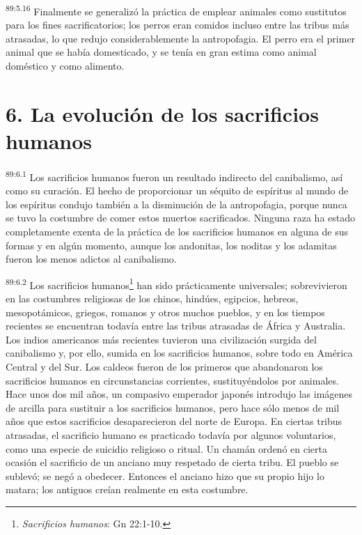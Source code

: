 \par
\textsuperscript{89:5.16} Finalmente se generalizó la práctica de emplear animales como sustitutos para los fines sacrificatorios; los perros eran comidos incluso entre las tribus más atrasadas, lo que redujo considerablemente la antropofagia. El perro era el primer animal que se había domesticado, y se tenía en gran estima como animal doméstico y como alimento.

\section*{6. La evolución de los sacrificios humanos}
\par
\textsuperscript{89:6.1} Los sacrificios humanos fueron un resultado indirecto del canibalismo, así como su curación. El hecho de proporcionar un séquito de espíritus al mundo de los espíritus condujo también a la disminución de la antropofagia, porque nunca se tuvo la costumbre de comer estos muertos sacrificados. Ninguna raza ha estado completamente exenta de la práctica de los sacrificios humanos en alguna de sus formas y en algún momento, aunque los andonitas, los noditas y los adamitas fueron los menos adictos al canibalismo.

\par
\textsuperscript{89:6.2} Los sacrificios humanos\footnote{\textit{Sacrificios humanos}: Gn 22:1-10.} han sido prácticamente universales; sobrevivieron en las costumbres religiosas de los chinos, hindúes, egipcios, hebreos, mesopotámicos, griegos, romanos y otros muchos pueblos, y en los tiempos recientes se encuentran todavía entre las tribus atrasadas de África y Australia. Los indios americanos más recientes tuvieron una civilización surgida del canibalismo y, por ello, sumida en los sacrificios humanos, sobre todo en América Central y del Sur. Los caldeos fueron de los primeros que abandonaron los sacrificios humanos en circunstancias corrientes, sustituyéndolos por animales. Hace unos dos mil años, un compasivo emperador japonés introdujo las imágenes de arcilla para sustituir a los sacrificios humanos, pero hace sólo menos de mil años que estos sacrificios desaparecieron del norte de Europa. En ciertas tribus atrasadas, el sacrificio humano es practicado todavía por algunos voluntarios, como una especie de suicidio religioso o ritual. Un chamán ordenó en cierta ocasión el sacrificio de un anciano muy respetado de cierta tribu. El pueblo se sublevó; se negó a obedecer. Entonces el anciano hizo que su propio hijo lo matara; los antiguos creían realmente en esta costumbre.

